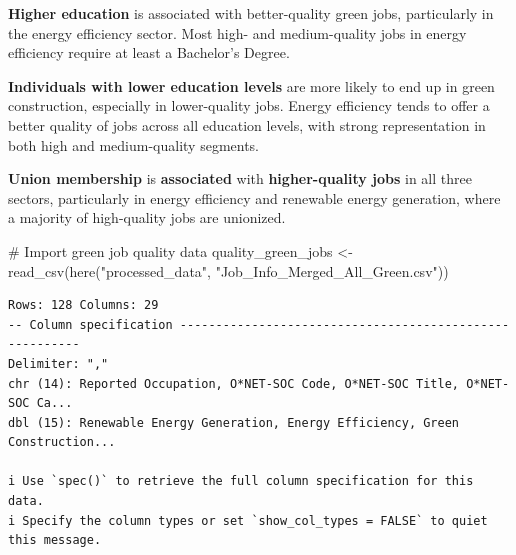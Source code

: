 \documentclass[
  letterpaper,
  DIV=11,
  numbers=noendperiod]{scrartcl}
\newenvironment{Shaded}{\begin{snugshade}}{\end{snugshade}}
\newcommand{\CommentTok}[1]{\textcolor[rgb]{0.37,0.37,0.37}{#1}}
\newcommand{\FunctionTok}[1]{\textcolor[rgb]{0.28,0.35,0.67}{#1}}
\newcommand{\NormalTok}[1]{\textcolor[rgb]{0.00,0.23,0.31}{#1}}
\newcommand{\OtherTok}[1]{\textcolor[rgb]{0.00,0.23,0.31}{#1}}
\newcommand{\StringTok}[1]{\textcolor[rgb]{0.13,0.47,0.30}{#1}}
\begin{document}
\begin{tcolorbox}[enhanced jigsaw, coltitle=black, opacitybacktitle=0.6, rightrule=.15mm, colframe=quarto-callout-note-color-frame, bottomtitle=1mm, title=\textcolor{quarto-callout-note-color}{\faInfo}\hspace{0.5em}{RQ 3: What is the quality of these green jobs? How much do they pay?
What qualifications are needed (education and experience) nationally?}, breakable, colback=white, toptitle=1mm, titlerule=0mm, arc=.35mm, opacityback=0, left=2mm, bottomrule=.15mm, toprule=.15mm, colbacktitle=quarto-callout-note-color!10!white, leftrule=.75mm]

\textbf{Higher education} is associated with better-quality green jobs,
particularly in the energy efficiency sector. Most high- and
medium-quality jobs in energy efficiency require at least a Bachelor's
Degree.

\textbf{Individuals with lower education levels} are more likely to end
up in green construction, especially in lower-quality jobs. Energy
efficiency tends to offer a better quality of jobs across all education
levels, with strong representation in both high and medium-quality
segments.

\textbf{Union membership} is \textbf{associated} with
\textbf{higher-quality jobs} in all three sectors, particularly in
energy efficiency and renewable energy generation, where a majority of
high-quality jobs are unionized.

\end{tcolorbox}

\begin{Shaded}
\begin{Highlighting}[]
\CommentTok{\# Import green job quality data}
\NormalTok{quality\_green\_jobs }\OtherTok{\textless{}{-}} \FunctionTok{read\_csv}\NormalTok{(}\FunctionTok{here}\NormalTok{(}\StringTok{"processed\_data"}\NormalTok{, }\StringTok{"Job\_Info\_Merged\_All\_Green.csv"}\NormalTok{))}
\end{Highlighting}
\end{Shaded}

\begin{verbatim}
Rows: 128 Columns: 29
-- Column specification --------------------------------------------------------
Delimiter: ","
chr (14): Reported Occupation, O*NET-SOC Code, O*NET-SOC Title, O*NET-SOC Ca...
dbl (15): Renewable Energy Generation, Energy Efficiency, Green Construction...

i Use `spec()` to retrieve the full column specification for this data.
i Specify the column types or set `show_col_types = FALSE` to quiet this message.
\end{verbatim}
\end{document}
